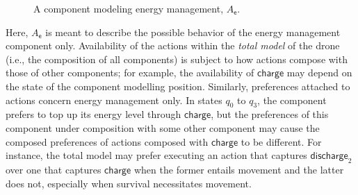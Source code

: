 \documentclass[a4paper]{article}
\theoremstyle{definition}
\newcommand{\discharge}{\mathsf{discharge}}
\newcommand{\charge}{\mathsf{charge}}
\newcommand{\e}{\mathsf{e}}
\begin{document}
\begin{figure}[ht!]
    \centering
    \caption{A component modeling energy management, $A_\e$.}\label{figure:sca-energy}
\end{figure}

Here, $A_\e$ is meant to describe the possible behavior of the energy management component only. Availability of the actions within the \emph{total model} of the drone (i.e., the composition of all components) is subject to how actions compose with those of other components; for example, the availability of $\charge$ may depend on the state of the component modelling position. Similarly, preferences attached to actions concern energy management only. In states $q_0$ to $q_3$, the component prefers to top up its energy level through $\charge$, but the preferences of this component under composition with some other component may cause the composed preferences of actions composed with $\charge$ to be different. For instance, the total model may prefer executing an action that captures $\discharge_2$ over one that captures $\charge$ when the former entails movement and the latter does not, especially when survival necessitates movement. 
\end{document}
